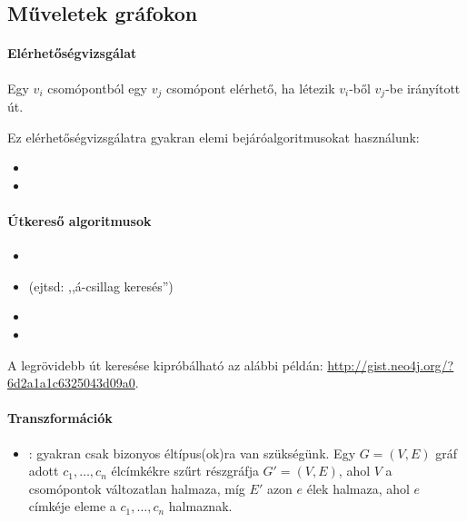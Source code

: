 \subsection{Műveletek gráfokon}

\paragraph{Elérhetőségvizsgálat}

Egy $v_i$ csomópontból egy $v_j$ csomópont elérhető, ha létezik $v_i$-ből $v_j$-be irányított út.

Ez elérhetőségvizsgálatra gyakran elemi bejáróalgoritmusokat használunk:

\begin{itemize}
\item {}
\item {}
\end{itemize}

\paragraph{Útkereső algoritmusok}

\begin{itemize}
\item {}
\item {} (ejtsd: ,,á-csillag keresés'')
\item {}
\item {}
\end{itemize}

A legrövidebb út keresése kipróbálható az alábbi példán: \url{http://gist.neo4j.org/?6d2a1a1c6325043d09a0}.

\paragraph{Transzformációk}

\begin{itemize}
\item {}: gyakran csak bizonyos éltípus(ok)ra van szükségünk. Egy $G = (V, E)$ gráf adott $c_1, \dots, c_n$ élcímkékre szűrt részgráfja $G' = (V, E)$, ahol $V$ a csomópontok változatlan halmaza, míg $E'$ azon $e$ élek halmaza, ahol $e$ címkéje eleme a $c_1, \dots, c_n$ halmaznak.
\end{itemize}



